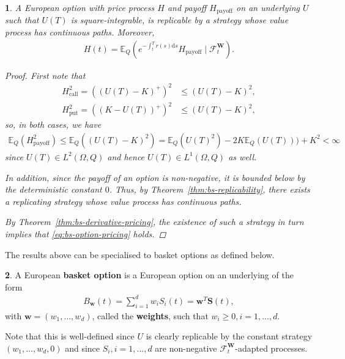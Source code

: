 \documentclass[english]{article}
\numberwithin{equation}{section}
\numberwithin{figure}{section}
\theoremstyle{bolddescit}
\newtheorem{theorem}{\protect\theoremname}[section]
\theoremstyle{definition}
\newtheorem{definition}[theorem]{\protect\definitionname}
\theoremstyle{definition}
\theoremstyle{plain}
\theoremstyle{plain}
\theoremstyle{bolddesc}
\theoremstyle{plain}
\theoremstyle{remark}
\providecommand{\definitionname}{Definition}
\providecommand{\theoremname}{Theorem}
\begin{document}
\begin{theorem}\label{thm:bs-option-pricing}
  A European option with price process $H$ and payoff $H_\text{payoff}$ on an underlying $U$ such that $U(T)$ is square-integrable, is replicable by a strategy whose value process has continuous paths. Moreover,
  \begin{align}\label{eq:bs-option-pricing}
    H(t) = \mathbb{E}_Q\left(e^{-\int_t^T r(s) \mathrm{d}s} H_\text{payoff} \mid \mathcal{F}^\mathbf{W}_t\right).
  \end{align}

  \begin{proof}
    First note that
    \begin{align*}
      H_\text{call}^2 = ((U(T) - K)^+)^2 &\le (U(T) - K)^2,\\
      H_\text{put}^2 = ((K - U(T))^+)^2 &\le (U(T) - K)^2,
    \end{align*}
    so, in both cases, we have
    \begin{align*}
      \mathbb{E}_Q(H_\text{payoff}^2)
      \le \mathbb{E}_Q((U(T) - K)^2)
      = \mathbb{E}_Q(U(T)^2) - 2K\mathbb{E}_Q(U(T))) + K^2
      < \infty
    \end{align*}
    since $U(T) \in L^2(\Omega, Q)$ and hence $U(T) \in L^1(\Omega, Q)$ as well.

    In addition, since the payoff of an option is non-negative, it is bounded below by the deterministic constant $0$. Thus, by Theorem~\ref{thm:bs-replicability}, there exists a replicating strategy whose value process has continuous paths.

    By Theorem~\ref{thm:bs-derivative-pricing}, the existence of such a strategy in turn implies that \eqref{eq:bs-option-pricing} holds.
  \end{proof}
\end{theorem}

The results above can be specialised to basket options as defined below.

\begin{definition}
  A European \textbf{basket option} is a European option on an underlying of the form
  \begin{align*}
    B_\mathbf{w}(t) = \sum_{i=1}^{d} w_i S_i(t) = \mathbf{w}^T \mathbf{S}(t),
  \end{align*}
  with $\mathbf{w} = (w_1, \ldots, w_d)$, called the \textbf{weights}, such that $w_i \ge 0, i=1,\ldots,d$.
\end{definition}

Note that this is well-defined since $U$ is clearly replicable by the constant strategy $(w_1, \ldots, w_d, 0)$ and since $S_i, i=1,\ldots,d$ are non-negative $\mathcal{F}^\mathbf{W}_t$-adapted processes.
\end{document}
